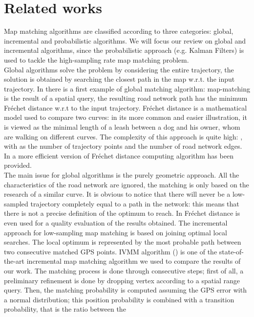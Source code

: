 \documentclass[5p]{elsarticle}
\begin{document}
\section{Related works}
Map matching algorithms are classified according to three categories: global, incremental and probabilistic algorithms. We will focus our
review on global and incremental algorithms, since the probabilistic approach (e.g. Kalman Filters) is used to tackle the high-sampling rate map matching problem. \\
Global algorithms solve the problem by considering the entire trajectory, the solution is obtained by searching the closest path in the map w.r.t. the input trajectory.
In \cite{alt2003matching} there is a first example of global matching algorithm: map-matching is the result of a spatial query, the resulting road network path has the
 minimum Fréchet distance w.r.t to the input trajectory. Fréchet distance is a mathematical model 
used to compare two curves: in its more common and easier illustration, 
it is viewed as the minimal length of a leash between a dog and his owner, whom are walking on different curves. The complexity of this approach is quite high: , with  as the number of trajectory points and  the number of road network edges.
In \cite{chen2011approximate} a more efficient version of Fréchet distance computing algorithm has been provided. \\
The main issue for global algorithms is the purely geometric approach. All the characteristics of the road network are ignored, the matching is only based on the research
 of a similar curve. It is obvious to notice that there will never be a low-sampled trajectory completely equal to a path in the network: this means that there is not a precise definition of the optimum to reach. 
In \cite{brakatsoulas2005map} Fréchet distance is even used for a quality evaluation of the results obtained.
The incremental approach for low-sampling map matching is based on joining optimal local searches. The local optimum is represented by the most probable path between two 
consecutive matched GPS points. 
IVMM algorithm (\cite{yuan2010interactive}) is one of the state-of-the-art incremental map matching algorithm we used to compare the results of our work. The matching 
process is done through consecutive steps; first of all, a preliminary refinement is done by dropping vertex according 
to a spatial range query. Then, the matching probability is computed assuming the GPS error with a normal distribution; this position probability is combined with a 
transition probability, that is the ratio between the 
\end{document}
